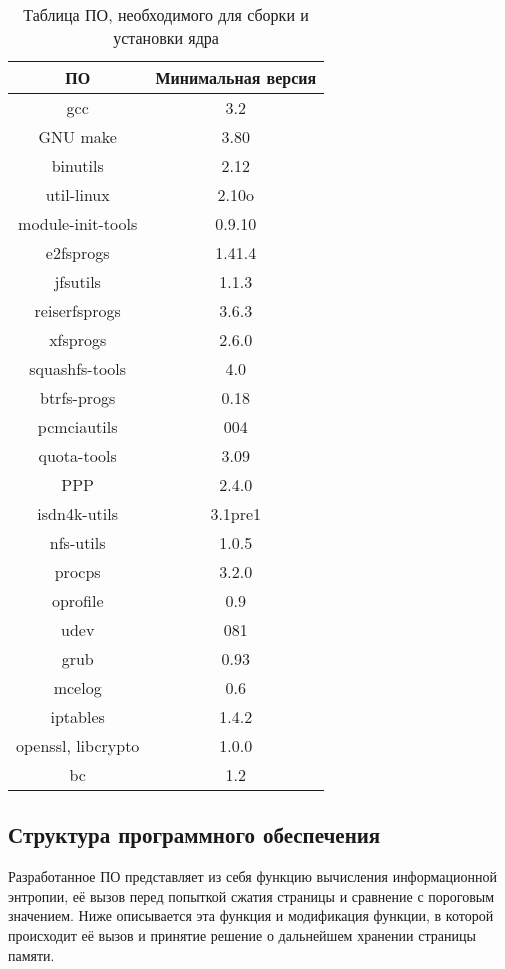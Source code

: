 \begin{table}[!htb]
	\label{table:dependencies}
	\begin{center}
		\caption{Таблица ПО, необходимого для сборки и установки ядра}
		\begin{tabular}{|c|c|}
			\hline
			\bfseries ПО & \bfseries Минимальная версия \\
			\hline
			gcc & 3.2 \\ \hline
			GNU make & 3.80 \\ \hline
			binutils & 2.12 \\ \hline
			util-linux & 2.10o \\ \hline
			module-init-tools & 0.9.10 \\ \hline
			e2fsprogs & 1.41.4 \\ \hline
			jfsutils & 1.1.3 \\ \hline
			reiserfsprogs & 3.6.3 \\ \hline
			xfsprogs & 2.6.0 \\ \hline
			squashfs-tools & 4.0 \\ \hline
			btrfs-progs & 0.18 \\ \hline
			pcmciautils & 004 \\ \hline
			quota-tools & 3.09 \\ \hline
			PPP & 2.4.0 \\ \hline
			isdn4k-utils & 3.1pre1 \\ \hline
			nfs-utils & 1.0.5 \\ \hline
			procps & 3.2.0 \\ \hline
			oprofile & 0.9 \\ \hline
			udev & 081 \\ \hline
			grub & 0.93 \\ \hline
			mcelog & 0.6 \\ \hline
			iptables & 1.4.2 \\ \hline
			openssl, libcrypto & 1.0.0 \\ \hline
			bc & 1.2 \\ \hline
		\end{tabular}
	\end{center}
\end{table}

\subsection{Структура программного обеспечения}

Разработанное ПО представляет из себя функцию вычисления информационной энтропии, её вызов перед попыткой сжатия страницы и сравнение с пороговым значением. Ниже описывается эта функция и модификация функции, в которой происходит её вызов и принятие решение о дальнейшем хранении страницы памяти.


